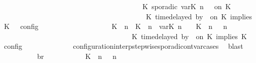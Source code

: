 \begin{isabellebody}
\ \ \ \ \ \ \ \ \ \ \ \ \ \ \ \ \ \ \ \ \ \ \ \ \ \ \ \ \ \ \ \ \ \ \ \ \ \ {\isasymtriangleright}\ {\isacharparenleft}{\isacharparenleft}K\ sporadic{\isasymsharp}\ {\isasymlparr}{\isasymtau}\isactrlsub v\isactrlsub a\isactrlsub r{\isacharparenleft}K\ n{\isacharparenright}\ {\isasymoplus}\ {\isasymdelta}{\isasymtau}{\isasymrparr}\ on\ K\isanewline
\ \ \ \ \ \ \ \ \ \ \ \ \ \ \ \ \ \ \ \ \ \ \ \ \ \ \ \ \ \ \ \ \ \ \ \ \ \ \ {\isacharhash}\ {\isacharparenleft}K\ time{\isacharminus}delayed{\isasymsharp}\ by\ {\isasymdelta}{\isasymtau}\ on\ K\ implies\ K\ {\isacharhash}\ {\isasymPhi}{\isacharparenright}\ {\isasymrbrakk}\isactrlsub c\isactrlsub o\isactrlsub n\isactrlsub f\isactrlsub i\isactrlsub g\isanewline
\ \ \ \ \ \ \ \ \ \ \ \ \ \ \ \ \ \ {\isasymunion}\ {\isasymlbrakk}\ {\isacharparenleft}{\isacharparenleft}K\ {\isasymUp}\ n{\isacharparenright}\ {\isacharhash}\ {\isacharparenleft}K\ {\isasymDown}\ n\ {\isacharat}{\isasymsharp}\ {\isasymlparr}{\isasymtau}\isactrlsub v\isactrlsub a\isactrlsub r{\isacharparenleft}K\ n{\isacharparenright}\ {\isasymoplus}\ {\isasymdelta}{\isasymtau}{\isasymrparr}{\isacharparenright}\ {\isacharhash}\ {\isacharparenleft}K\ {\isasymUp}\ n{\isacharparenright}\ {\isacharhash}\ {\isasymGamma}{\isacharparenright}{\isacharcomma}\ n\isanewline
\ \ \ \ \ \ \ \ \ \ \ \ \ \ \ \ \ \ \ \ \ \ \ \ \ \ \ \ \ \ \ \ \ {\isasymturnstile}\ {\isasymPsi}\ {\isasymtriangleright}\ {\isacharparenleft}{\isacharparenleft}K\ time{\isacharminus}delayed{\isasymsharp}\ by\ {\isasymdelta}{\isasymtau}\ on\ K\ implies\ K\ {\isacharhash}\ {\isasymPhi}{\isacharparenright}\ {\isasymrbrakk}\isactrlsub c\isactrlsub o\isactrlsub n\isactrlsub f\isactrlsub i\isactrlsub g{\isacartoucheclose}\isanewline
\ \ \ \ \ \ \ \ \ \ \ \ \isamarkupfalse%
\ configuration{\isacharunderscore}interp{\isacharunderscore}stepwise{\isacharunderscore}sporadicon{\isacharunderscore}tvar{\isacharunderscore}cases\ \isamarkupfalse%
\ blast\isanewline
\ \ \ \ \ \ \isamarkupfalse%
\ \isamarkupfalse%
\ br{}{\isacharcolon}\isanewline
\ \ \ \ \ \ \ \ {\isacartoucheopen}{\isasymrho}\ {\isasymin}\ {\isasymlbrakk}\ {\isacharparenleft}{\isacharparenleft}K\ {\isasymnot}{\isasymUp}\ n{\isacharparenright}\ {\isacharhash}\ {\isasymGamma}{\isacharparenright}{\isacharcomma}\ n\isanewline

\end{isabellebody}
